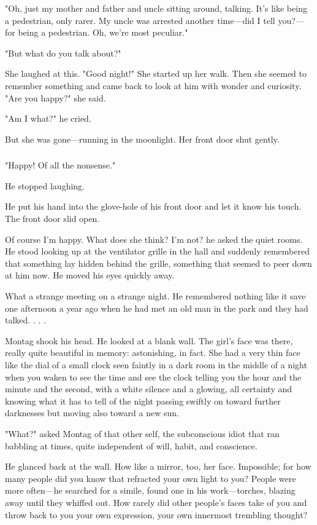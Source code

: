 \documentclass[10pt,a4paper]{article}
\begin{document}
"Oh, just my mother and father and uncle sitting 
around, talking. It's like being a pedestrian, only rarer. My 
uncle was arrested another time—did I tell you?—for being a 
pedestrian. Oh, we're most peculiar." 

"But what do you talk about?" 

She laughed at this. "Good night!" She started up her 
walk. Then she seemed to remember something and came 
back to look at him with wonder and curiosity. "Are you 
happy?" she said. 

"Am I what?" he cried. 

But she was gone—running in the moonlight. Her 
front door shut gently. 

\subsubsection*{}
"Happy! Of all the nonsense." 

He stopped laughing. 

He put his hand into the glove-hole of his front door 
and let it know his touch. The front door slid open. 

Of course I'm happy. What does she think? I'm not? 
he asked the quiet rooms. He stood looking up at the 
ventilator grille in the hall and suddenly remembered that 
something lay hidden behind the grille, something that 
seemed to peer down at him now. He moved his eyes quickly 
away. 

What a strange meeting on a strange night. He 
remembered nothing like it save one afternoon a year ago 
when he had met an old man in the park and they had 
talked. . . . 

Montag shook his head. He looked at a blank wall. 
The girl's face was there, really quite beautiful in memory: 
astonishing, in fact. She had a very thin face like the dial of 
a small clock seen faintly in a dark room in the middle of a 
night when you waken to see the time and see the clock 
telling you the hour and the minute and the second, with a 
white silence and a glowing, all certainty and knowing what 
it has to tell of the night passing swiftly on toward further 
darknesses but moving also toward a new sun. 

"What?" asked Montag of that other self, the 
subconscious idiot that ran babbling at times, quite 
independent of will, habit, and conscience. 

He glanced back at the wall. How like a mirror, too, 
her face. Impossible; for how many people did you know that 
refracted your own light to you? People were more often—he 
searched for a simile, found one in his work—torches, 
blazing away until they whiffed out. How rarely did other 
people's faces take of you and throw back to you your own 
expression, your own innermost trembling thought? 
\end{document}
